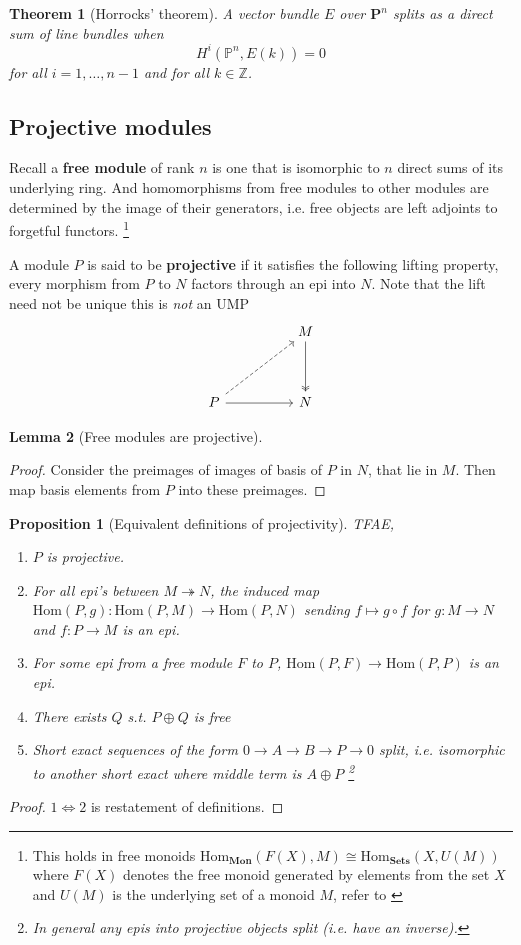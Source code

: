\documentclass[12pt]{article}
\numberwithin{equation}{section}
\newcommand{\Z}{\mathbb{Z}}
\newcommand{\Hom}{{\mathrm{Hom}}}
\newtheorem{theorem}{Theorem}[section]
\newtheorem{lemma}[theorem]{Lemma}
\newtheorem{proposition}{Proposition}[section]
\begin{document}
	\begin{theorem}[Horrocks' theorem]
		A vector bundle $E$ over $\mathbf{P}^n$ splits as a direct sum of line bundles when \[ H^i ( \mathbb{P}^n, E(k))=0 \]
		for all $i=1, \dots, n-1 $ and for all $k \in \Z$.
	\end{theorem}
	
	\begin{appendices}
	\section{Projective modules}
	Recall a\textbf{ free module} of rank $n$ is one that is isomorphic to $n$ direct sums of its underlying ring. And homomorphisms from free modules to other modules are determined by the image of their generators, i.e. free objects are left adjoints to forgetful functors. \footnote{This holds in free monoids $\mathrm{Hom}_\mathbf{Mon}(F(X), M) \cong \mathrm{Hom}_\mathbf{Sets} (X, U(M))$ where $F(X)$ denotes the free monoid generated by elements from the set $X$ and $U(M)$ is the underlying set of a monoid $M$, refer to \cite[p. ~208]{Awodey} }
	
	A module $P$ is said to be \textbf{projective} if it satisfies the following lifting property, every morphism from $P$ to $N$ factors through an epi into $N$. Note that the lift need not be unique this is \textit{not} an UMP
	\[\begin{tikzcd}
		&& M \\
		\\
		P && N
		\arrow[two heads, from=1-3, to=3-3]
		\arrow[from=3-1, to=3-3]
		\arrow[dashed, from=3-1, to=1-3]
	\end{tikzcd}\]
	\begin{lemma}[Free modules are projective]
	\end{lemma}
	\begin{proof}
		Consider the preimages of images of basis of $P$ in $N$, that lie in $M$. Then map basis elements from $P$ into these preimages.
	\end{proof}
	\begin{proposition}[Equivalent definitions of projectivity]
		TFAE,
		\begin{enumerate}
			\item $P$ is projective.
			\item For all epi's between $M\twoheadrightarrow N$, the induced map $\Hom(P,g):\mathrm{Hom}(P,M) \to \mathrm{Hom}(P,N)$ sending $f \mapsto g \circ f$ for $g:M \to N$ and $f:P \to M$ is an epi.
			\item For some epi from a free module $F$ to $P$, $\mathrm{Hom}(P,F) \to \mathrm{Hom}(P,P)$ is an epi.
			\item There exists $Q$ s.t. $P \oplus Q$ is free
			\item Short exact sequences of the form $0 \to A \to B \to P \to 0$ split, i.e. isomorphic to another short exact where middle term is $A \oplus P$ \footnote{In general any epis into projective objects split (i.e. have an inverse).}
		\end{enumerate}
	\end{proposition}
	\begin{proof}
		$1 \iff 2$ is restatement of definitions.
		

\end{proof}
\end{appendices}
\end{document}
